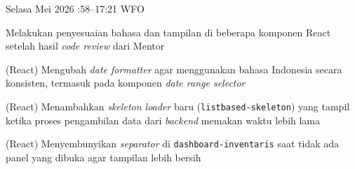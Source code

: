 \begin{logtable}
    {
        Selasa  Mei 2026 :58--17:21 \linebreak %
        WFO
    }{
        \begin{loglist}
            \item Melakukan penyesuaian bahasa dan tampilan di beberapa komponen React setelah
            hasil \textit{code review} dari Mentor
        \end{loglist}
    }{
        \begin{logwork}
            \item (React) Mengubah \textit{date formatter} agar menggunakan bahasa Indonesia secara konsisten, termasuk pada komponen \textit{date range selector}
            \item (React) Menambahkan \textit{skeleton loader} baru (\texttt{listbased-skeleton}) yang tampil ketika proses pengambilan data dari \textit{backend} memakan waktu lebih lama
            \item (React) Menyembunyikan \textit{separator} di \texttt{dashboard-inventaris} saat tidak ada panel yang dibuka agar tampilan lebih bersih
        \end{logwork}
    }


\end{logtable}
